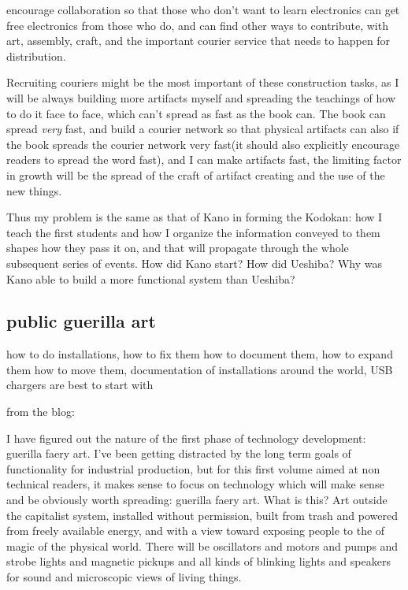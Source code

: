 encourage collaboration so that those who don't want to learn
electronics can get free electronics from those who do, and can find
other ways to contribute, with art, assembly, craft, and the important
courier service that needs to happen for distribution.

Recruiting couriers might be the most important of these construction
tasks, as I will be always building more artifacts myself and spreading
the teachings of how to do it face to face, which can't spread as fast
as the book can. The book can spread \emph{very} fast, and build a
courier network so that physical artifacts can also if the book spreads
the courier network very fast(it should also explicitly encourage
readers to spread the word fast), and I can make artifacts fast, the
limiting factor in growth will be the spread of the craft of artifact
creating and the use of the new things.

Thus my problem is the same as that of Kano in forming the Kodokan: how
I teach the first students and how I organize the information conveyed
to them shapes how they pass it on, and that will propagate through the
whole subsequent series of events. How did Kano start? How did Ueshiba?
Why was Kano able to build a more functional system than Ueshiba?

\subsection{public guerilla art}\label{public-guerilla-art}

how to do installations, how to fix them how to document them, how to
expand them how to move them, documentation of installations around the
world, USB chargers are best to start with

from the blog:

I have figured out the nature of the first phase of technology
development: guerilla faery art. I've been getting distracted by the
long term goals of functionality for industrial production, but for this
first volume aimed at non technical readers, it makes sense to focus on
technology which will make sense and be obviously worth spreading:
guerilla faery art. What is this? Art outside the capitalist system,
installed without permission, built from trash and powered from freely
available energy, and with a view toward exposing people to the of magic
of the physical world. There will be oscillators and motors and pumps
and strobe lights and magnetic pickups and all kinds of blinking lights
and speakers for sound and microscopic views of living things.

